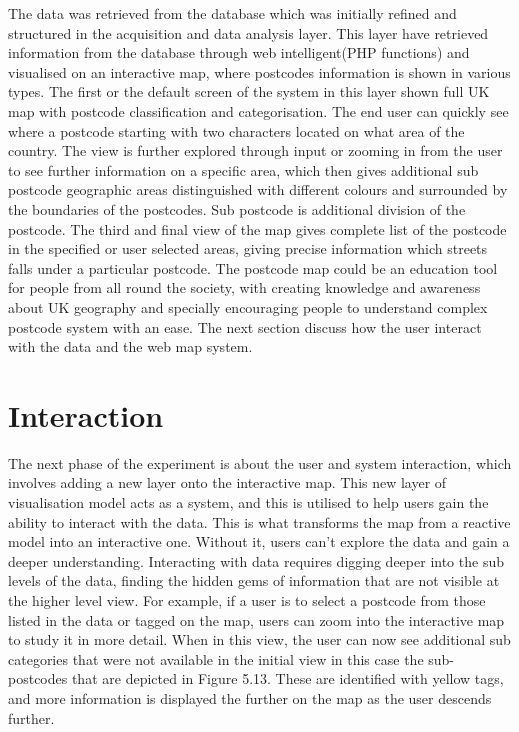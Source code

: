 The data was retrieved from the database which was initially refined and structured in the acquisition and data analysis layer. This layer have retrieved information from the database through web intelligent(PHP functions) and visualised on an interactive map, where postcodes information is shown in various types. The first or the default screen of the system in this layer shown full UK map with postcode classification and categorisation. The end user can quickly see where a postcode starting with two characters located on what area of the country. The view is further explored through input or zooming in from the user to see further information on a specific area, which then gives additional sub postcode geographic areas distinguished with different colours and surrounded by the boundaries of the postcodes. Sub postcode is additional division of the postcode. The third and final view of the map gives complete list of the postcode in the specified or user selected areas, giving precise information which streets falls under a particular postcode. The postcode map could be an education tool for people from all round the society, with creating knowledge and awareness about UK geography and specially encouraging people to understand complex postcode system with an ease. The next section discuss how the user interact with the data and the web map system.

\section{Interaction }

The next phase of the experiment is about the user and system interaction, which involves adding a new layer onto the interactive map. This new layer of visualisation model acts as a system, and this is utilised to help users gain the ability to interact with the data. This is what transforms the map from a reactive model into an interactive one. Without it, users can't explore the data and gain a deeper understanding. Interacting with data requires digging deeper into the sub levels of the data, finding the hidden gems of information that are not visible at the higher level view. For example, if a user is to select a postcode from those listed in the data or tagged on the map, users can zoom into the interactive map to study it in more detail. When in this view, the user can now see additional sub categories that were not available in the initial view in this case the sub-postcodes that are depicted in Figure 5.13. These are identified with yellow tags, and more information is displayed the further on the map as the user descends further.

